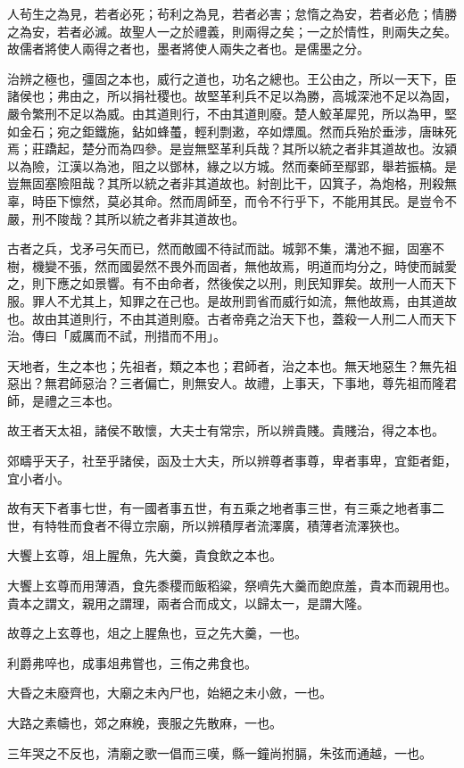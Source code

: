 \begin{pinyinscope}
人茍生之為見，若者必死；茍利之為見，若者必害；怠惰之為安，若者必危；情勝之為安，若者必滅。故聖人一之於禮義，則兩得之矣；一之於情性，則兩失之矣。故儒者將使人兩得之者也，墨者將使人兩失之者也。是儒墨之分。

治辨之極也，彊固之本也，威行之道也，功名之總也。王公由之，所以一天下，臣諸侯也；弗由之，所以捐社稷也。故堅革利兵不足以為勝，高城深池不足以為固，嚴令繁刑不足以為威。由其道則行，不由其道則廢。楚人鮫革犀兕，所以為甲，堅如金石；宛之鉅鐵施，鉆如蜂蠆，輕利剽遫，卒如熛風。然而兵殆於垂涉，唐昧死焉；莊蹻起，楚分而為四參。是豈無堅革利兵哉？其所以統之者非其道故也。汝潁以為險，江漢以為池，阻之以鄧林，緣之以方城。然而秦師至鄢郢，舉若振槁。是豈無固塞險阻哉？其所以統之者非其道故也。紂剖比干，囚箕子，為炮格，刑殺無辜，時臣下懔然，莫必其命。然而周師至，而令不行乎下，不能用其民。是豈令不嚴，刑不陖哉？其所以統之者非其道故也。

古者之兵，戈矛弓矢而已，然而敵國不待試而詘。城郭不集，溝池不掘，固塞不樹，機變不張，然而國晏然不畏外而固者，無他故焉，明道而均分之，時使而誠愛之，則下應之如景響。有不由命者，然後俟之以刑，則民知罪矣。故刑一人而天下服。罪人不尤其上，知罪之在己也。是故刑罰省而威行如流，無他故焉，由其道故也。故由其道則行，不由其道則廢。古者帝堯之治天下也，蓋殺一人刑二人而天下治。傳曰「威厲而不試，刑措而不用」。

天地者，生之本也；先祖者，類之本也；君師者，治之本也。無天地惡生？無先祖惡出？無君師惡治？三者偏亡，則無安人。故禮，上事天，下事地，尊先祖而隆君師，是禮之三本也。

故王者天太祖，諸侯不敢懷，大夫士有常宗，所以辨貴賤。貴賤治，得之本也。

郊疇乎天子，社至乎諸侯，函及士大夫，所以辨尊者事尊，卑者事卑，宜鉅者鉅，宜小者小。

故有天下者事七世，有一國者事五世，有五乘之地者事三世，有三乘之地者事二世，有特牲而食者不得立宗廟，所以辨積厚者流澤廣，積薄者流澤狹也。

大饗上玄尊，俎上腥魚，先大羹，貴食飲之本也。

大饗上玄尊而用薄酒，食先黍稷而飯稻粱，祭嚌先大羹而飽庶羞，貴本而親用也。貴本之謂文，親用之謂理，兩者合而成文，以歸太一，是謂大隆。

故尊之上玄尊也，俎之上腥魚也，豆之先大羹，一也。

利爵弗啐也，成事俎弗嘗也，三侑之弗食也。

大昏之未廢齊也，大廟之未內尸也，始絕之未小斂，一也。

大路之素幬也，郊之麻絻，喪服之先散麻，一也。

三年哭之不反也，清廟之歌一倡而三嘆，縣一鐘尚拊膈，朱弦而通越，一也。


\end{pinyinscope}
